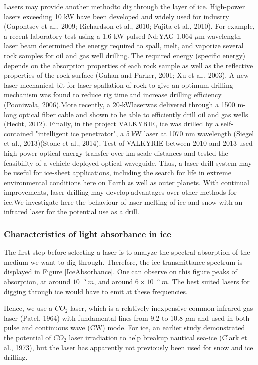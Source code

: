 
Lasers may provide another methodto dig through the layer of ice. High-power lasers exceeding 10 kW have been developed and widely used for industry (Gapontsev et al., 2009; Richardson et al., 2010; Fujita et al., 2010). For example, a recent laboratory test using a 1.6-kW pulsed Nd:YAG 1.064 $\mu$m wavelength laser beam determined the energy required to spall, melt, and
vaporize several rock samples for oil and gas well drilling. The required energy (specific energy) depends on the absorption properties of each rock sample as well as the reflective properties of the rock surface  (Gahan and Parker, 2001; Xu et al., 2003). A new laser-mechanical bit for laser spallation of rock to give an optimum drilling mechanism
was found to reduce rig time and increase drilling efficiency (Pooniwala, 2006).More recently, a 20-kWlaserwas delivered through a 1500 m-long optical fiber cable and shown to be able to efficiently drill oil and gas wells (Hecht, 2012). Finally, in the project VALKYRIE,
ice was drilled by a self-contained "intelligent ice penetrator", a 5 kW laser at 1070 nm wavelength (Siegel et al., 2013)(Stone et al., 2014).
Test of VALKYRIE between 2010 and 2013 used high-power optical energy transfer over km-scale distances and tested the feasibility of a vehicle deployed optical waveguide. Thus, a laser-drill system may be useful for ice-sheet applications, including the search for life in extreme environmental conditions here on Earth as well as outer planets.
With continual improvements, laser drilling may develop advantages over other methods for ice.We investigate here the behaviour of laser melting of ice and snow with an infrared laser for the potential use as a drill.


\subsubsection{Characteristics of light absorbance in ice}

The first step before selecting a laser is to analyze the spectral absorption of the medium we want to dig through. Therefore, the ice transmittance spectrum is displayed in Figure \ref{IceAbsorbance}. One can observe on this figure peaks of absorption, at around $10^{-5}~m$, and around $6\times10^{-5}~m$. The best suited lasers for digging through ice would have to emit at these frequencies.

Hence, we use a $CO_2$ laser, which is a relatively inexpensive common infrared gas laser (Patel, 1964) with fundamental lines from 9.2 to 10.8 $\mu$m and used in both pulse and continuous wave (CW) mode. For ice, an earlier study demonstrated the potential of $CO_2$ laser irradiation to help breakup nautical sea-ice (Clark et al.,  1973), but the laser has apparently not previously been used for snow and ice drilling.

